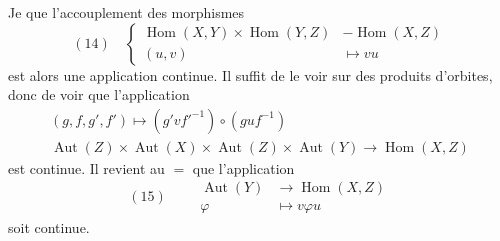 Je   que l'accouplement des morphismes
\[
(14)\quad\left\{
\begin{aligned}
\operatorname{Hom}(X,Y)\times\operatorname{Hom}(Y,Z)&\mathbin{-}\operatorname{Hom}(X,Z)\\
(u,v)&\longmapsto vu
\end{aligned}\right.
\]
est alors  une  application continue. Il suffit de le voir sur des produits d'orbites, donc de voir que  l'application
\[
\begin{gathered}
(g,f,g',f')\longmapsto(g'vf'^{-1})\circ(guf^{-1})\\
\operatorname{Aut}(Z)\times\operatorname{Aut}(X)\times\operatorname{Aut}(Z)\times\operatorname{Aut}(Y)\longrightarrow\operatorname{Hom}(X,Z)
\end{gathered}
\]
est continue. Il revient au $=$ que l'application
\[
(15)\qquad\begin{aligned}
\operatorname{Aut}(Y)&\longrightarrow\operatorname{Hom}(X,Z)\\
\varphi&\longmapsto v\varphi u
\end{aligned}
\]
soit continue.

